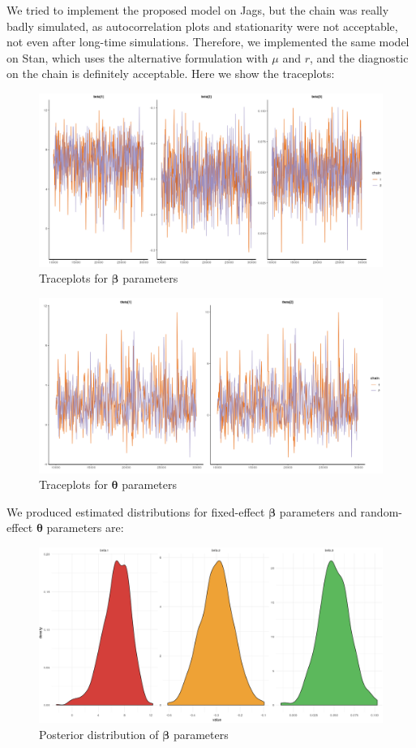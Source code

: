 \documentclass[11pt,twoside]{report}
\begin{document}
	We tried to implement the proposed model on Jags, but the chain was really badly simulated, as autocorrelation plots and stationarity were not acceptable, not even after long-time simulations. Therefore, we implemented the same model on Stan, which uses the alternative formulation with $\mu$ and $r$, and the diagnostic on the chain is definitely acceptable. Here we show the traceplots:
	\begin{figure}[H]
		\centering
		\includegraphics[width=110 mm]{pictures/negbin_double_r_trace_beta.png}
		\caption{Traceplots for $\boldsymbol{\beta}$ parameters}
		\label{fig:nb_d_trace_beta}
	\end{figure}
	\begin{figure}[H]
		\centering
		\includegraphics[width=130 mm]{pictures/negbin_double_r_trace_theta.png}
		\caption{Traceplots for $\boldsymbol{\theta}$ parameters}
		\label{fig:nb_d_trace_theta}
	\end{figure}
	We produced estimated distributions for fixed-effect $\boldsymbol{\beta}$ parameters and random-effect $\boldsymbol{\theta}$ parameters are:
	\begin{figure}[H]
		\centering
		\includegraphics[width=130 mm]{pictures/negbin_double_r_beta.png}
		\caption{Posterior distribution of $\boldsymbol{\beta}$ parameters}
		\label{fig:nb_d_beta}
	\end{figure}
\end{document}
